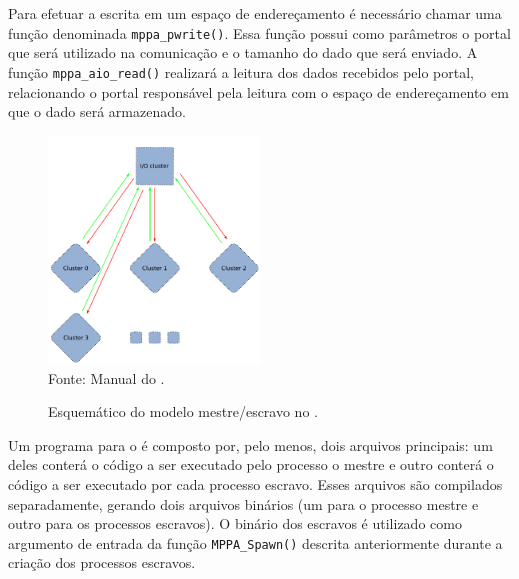 Para efetuar a escrita em um espaço de endereçamento é necessário chamar uma
função denominada \texttt{mppa\_pwrite()}. Essa função possui como parâmetros o
portal que será utilizado na comunicação e o tamanho do dado que será enviado.
A função \texttt{mppa\_aio\_read()} realizará a leitura dos dados recebidos pelo
portal, relacionando o portal responsável pela leitura com o espaço de
endereçamento em que o dado será armazenado.

\begin{figure}
	\centering
	\caption{Esquemático do modelo mestre/escravo no \mppa.}
	\includegraphics[width=0.5\textwidth]{figs/MPPAIPCTutorial.pdf} \\
    Fonte: Manual do \mppa.
	\label{fig:MPPAIPCTutorial}
\end{figure}

Um programa para o \mppa é composto por, pelo menos, dois arquivos principais:
um deles conterá o código a ser executado pelo processo o mestre e outro conterá o código
a ser executado por cada processo escravo. Esses arquivos são compilados separadamente,
gerando dois arquivos binários (um para o processo mestre e outro para os processos escravos).
O binário dos escravos é utilizado como argumento de entrada da função \texttt{MPPA\_Spawn()}
descrita anteriormente durante a criação dos processos escravos.

